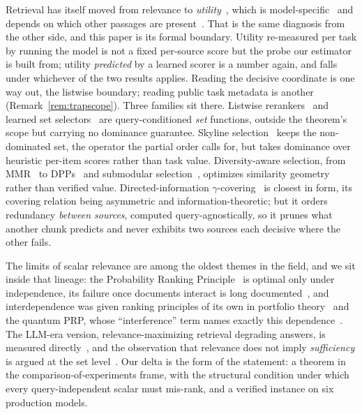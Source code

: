 \documentclass[11pt]{article}
\theoremstyle{plain}
\theoremstyle{definition}
\theoremstyle{remark}
\begin{document}
Retrieval has itself moved from relevance to \emph{utility}~\citep{zhang2026utility}, which is
model-specific~\citep{zhang2025llmutility} and depends on which other passages are
present~\citep{jain2025contextualutility}. That is the same diagnosis from the other side, and
this paper is its formal boundary. Utility re-measured per task by running the model is not a
fixed per-source score but the probe our estimator is built from; utility \emph{predicted} by a
learned scorer is a number again, and falls under whichever of the two results applies. Reading
the decisive coordinate is one way out, the listwise boundary; reading public task metadata is
another (Remark~\ref{rem:trapscope}). Three families sit there. Listwise
rerankers~\citep{sun2023rankgpt} and learned set selectors~\citep{optiset2026,rank4gen2026} are
query-conditioned \emph{set} functions, outside the theorem's scope but carrying no dominance
guarantee. Skyline selection~\citep{skylinerag2026} keeps the non-dominated set, the operator the
partial order calls for, but takes dominance over heuristic per-item scores rather than task
value. Diversity-aware selection, from MMR~\citep{carbonell1998} to DPPs~\citep{ye2023ceil} and
submodular selection~\citep{pacms2026}, optimizes similarity geometry rather than verified value.
Directed-information $\gamma$-covering~\citep{huang2025gammacover} is closest in form, its
covering relation being asymmetric and information-theoretic; but it orders redundancy
\emph{between sources}, computed query-agnostically, so it prunes what another chunk predicts and
never exhibits two sources each decisive where the other fails.

The limits of scalar relevance are among the oldest themes in the field, and we sit inside that
lineage: the Probability Ranking Principle~\citep{robertson1977} is optimal only under
independence, its failure once documents interact is long documented~\citep{fuhr2008}, and
interdependence was given ranking principles of its own in portfolio
theory~\citep{wang2009portfolio} and the quantum PRP, whose ``interference'' term names exactly
this dependence~\citep{zuccon2010qprp}. The LLM-era version, relevance-maximizing retrieval
degrading answers, is measured directly~\citep{relevanceutility2025}, and the observation that
relevance does not imply \emph{sufficiency} is argued at the set level~\citep{sureRAG2026}. Our
delta is the form of the statement: a theorem in the comparison-of-experiments frame, with the
structural condition under which every query-independent scalar must mis-rank, and a verified
instance on six production models.
\end{document}
